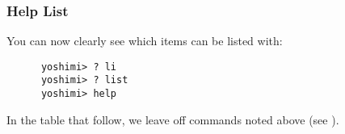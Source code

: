 %
%
%

\subsubsection{Help List}
\label{subsec:command_line_help_list}

   You can now clearly see which items can be listed with:

   \begin{verbatim}
      yoshimi> ? li
      yoshimi> ? list
      yoshimi> help
   \end{verbatim}

   In the table that follow, we leave off commands noted above
   (see ).


